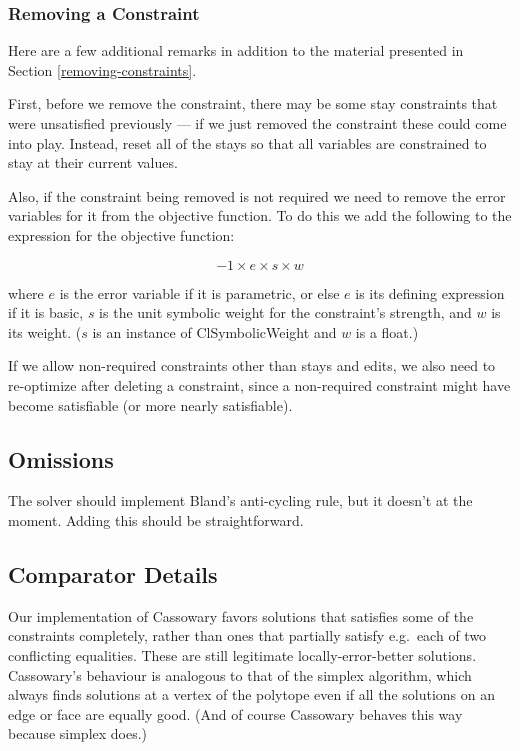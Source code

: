 \documentclass{article}
\begin{document}
\subsubsection{Removing a Constraint}

Here are a few additional remarks in addition to the material presented in
Section \ref{removing-constraints}.  

First, before we remove the constraint, there may be some stay constraints
that were unsatisfied previously --- if we just removed the constraint
these could come into play.  Instead, reset all of the stays so that all
variables are constrained to stay at their current values.

Also, if the constraint being removed is not required we need to remove the
error variables for it from the objective function.  To do this we add the
following to the expression for the objective function:

$$ -1 \times e \times s \times w $$

where $e$ is the error variable if it is parametric, or else $e$ is its
defining expression if it is basic, $s$ is the unit symbolic weight for the
constraint's strength, and $w$ is its weight.  ($s$ is an instance of 
{\sf ClSymbolicWeight} and $w$ is a float.)

If we allow non-required constraints other than stays and edits, we also
need to re-optimize after deleting a constraint, since a non-required
constraint might have become satisfiable (or more nearly satisfiable).

\subsection{Omissions}

The solver should implement Bland's anti-cycling rule, but it doesn't at the
moment.  Adding this should be straightforward.

\subsection{Comparator Details}  
\label{comparator-details}  

Our implementation of Cassowary favors solutions that satisfies some of the
constraints completely, rather than ones that partially satisfy e.g.\ each
of two conflicting equalities.  These are still legitimate
locally-error-better solutions.  Cassowary's behaviour is analogous to that
of the simplex algorithm, which always finds solutions at a vertex of the
polytope even if all the solutions on an edge or face are equally good.
(And of course Cassowary behaves this way because simplex does.)
\end{document}
